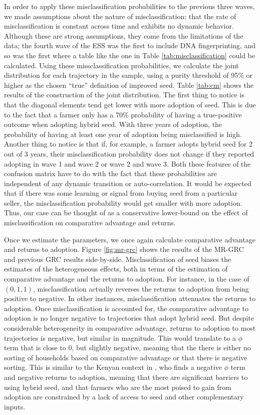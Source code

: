 \documentclass[11pt]{article}
\begin{document}
In order to apply these misclassification probabilities to the previous three waves, we made assumptions about the nature of misclassification: that the rate of misclassification is constant across time and exhibits no dynamic behavior. Although these are strong assumptions, they come from the limitations of the data; the fourth wave of the ESS was the first to include DNA fingerprinting, and so was the first where a table like the one in Table \ref{tab:misclassification} could be calculated. Using these missclassification probabilities, we calculate the joint distribution for each trajectory in the sample, using a purity threshold of 95\% or higher as the chosen ``true'' definition of improved seed. Table \ref{tab:cm} shows the results of the construction of the joint distribution. The first thing to notice is that the diagonal elements tend get lower with more adoption of seed. This is due to the fact that a farmer only has a 70\% probability of having a true-positive outcome when adopting hybrid seed. With three years of adoption, the probability of having at least one year of adoption being misclassified is high. Another thing to notice is that if, for example, a farmer adopts hybrid seed for 2 out of 3 years, their misclassification probability does not change if they reported adopting in wave 1 and wave 2 or wave 2 and wave 3. Both these features of the confusion matrix have to do with the fact that these probabilities are independent of any dynamic transition or auto-correlation. It would be expected that if there was some learning or signal from buying seed from a particular seller, the misclassification probability would get smaller with more adoption. Thus, our case can be thought of as a conservative lower-bound on the effect of misclassification on comparative advantage and returns.



Once we estimate the parameters, we once again calculate comparative advantage and returns to adoption. Figure \ref{fig:mr-grc} shows the results of the MR-GRC and previous GRC results side-by-side. Misclassification of seed biases the estimates of the heterogeneous effects, both in terms of the estimation of comparative advantage and the returns to adoption. For instance, in the case of $(0,1,1)$, misclassification actually reverses the returns to adoption from being positive to negative. In other instances, misclassification attenuates the returns to adoption. Once misclassification is accounted for, the comparative advantage to adoption is no longer negative to trajectories that adopt hybrid seed.  But despite considerable heterogeneity in comparative advantage, returns to adoption to most trajectories is negative, but similar in magnitude. This would translate to a $\phi$ term that is close to 0, but slightly negative, meaning that the there is either no sorting of households based on comparative advantage or that there is negative sorting. This is similar to the Kenyan context in \cite{Suri2011-oi}, who finds a negative $\phi$ term and negative returns to adoption, meaning  that there are significant barriers to using hybrid seed, and that farmers who are the most poised to gain from adoption are constrained by a lack of access to seed and other complementary inputs.
\end{document}
